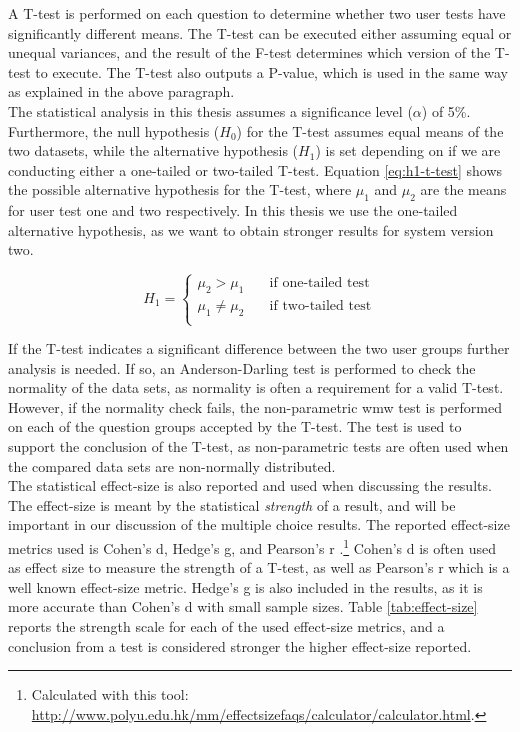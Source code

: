 A T-test \cite{walpole1993} is performed on each question to determine whether two user tests have significantly different means. The T-test can be executed either assuming equal or unequal variances, and the result of the F-test determines which version of the T-test to execute. The T-test also outputs a P-value, which is used in the same way as explained in the above paragraph. \\

The statistical analysis in this thesis assumes a significance level ($\alpha$) of 5\%. Furthermore, the null hypothesis ($H_0$) for the T-test assumes equal means of the two datasets, while the alternative hypothesis ($H_1$) is set depending on if we are conducting either a one-tailed or two-tailed T-test. Equation \ref{eq:h1-t-test} shows the possible alternative hypothesis for the T-test, where $\mu_{1}$ and $\mu_{2}$ are the means for user test one and two respectively. In this thesis we use the one-tailed alternative hypothesis, as we want to obtain stronger results for system version two.

\begin{equation} \label{eq:h1-t-test}
   H_1 =
    \begin{cases}
        \mu_{2} > \mu_{1} & \quad \text{if one-tailed test}\\
        \mu_{1} \neq \mu_{2} & \quad \text{if two-tailed test}\\
    \end{cases}
\end{equation}

If the T-test indicates a significant difference between the two user groups further analysis is needed. If so, an Anderson-Darling test \cite{razali2011} is performed to check the normality of the data sets, as normality is often a requirement for a valid T-test. However, if the normality check fails, the non-parametric \gls{wmw} test \cite{hodges2005} is performed on each of the question groups accepted by the T-test. The test is used to support the conclusion of the T-test, as non-parametric tests are often used when the compared data sets are non-normally distributed. \\

The statistical effect-size is also reported and used when discussing the results. The effect-size is meant by the statistical \textit{strength} of a result, and will be important in our discussion of the multiple choice results. The reported effect-size metrics used is Cohen's d, Hedge's g, and Pearson's r \cite{cumming2013}.\footnote{Calculated with this tool: \url{http://www.polyu.edu.hk/mm/effectsizefaqs/calculator/calculator.html}.} Cohen's d is often used as effect size to measure the strength of a T-test, as well as Pearson's r which is a well known effect-size metric. Hedge's g is also included in the results, as it is more accurate than Cohen's d with small sample sizes. Table \ref{tab:effect-size} reports the strength scale for each of the used effect-size metrics, and a conclusion from a test is considered stronger the higher effect-size reported. \\

